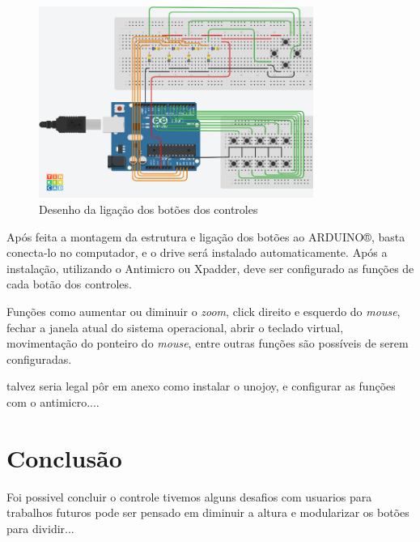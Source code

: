 \documentclass[
	12pt,			%
	openright,		%
	oneside,			%
	a4paper,			%
	chapter=TITLE,		%
	english,			%
	brazil,			%
	]{abntex2}
\begin{document}
\begin{figure}[H]
	\centering
		\includegraphics[width=0.8\textwidth]{./img/img-19.png}
		\caption{Desenho da ligação dos botões dos controles}
		\label{img:img-19}
\end{figure}

Após feita a montagem da estrutura e ligação dos botões ao ARDUINO®, basta conecta-lo no computador, e o drive será instalado automaticamente. Após a instalação, utilizando o Antimicro ou Xpadder, deve ser configurado as funções de cada botão dos controles.

Funções como aumentar ou diminuir o \emph{zoom}, click direito e esquerdo do \emph{mouse}, fechar a janela atual do sistema operacional, abrir o teclado virtual, movimentação do ponteiro do \emph{mouse}, entre outras funções são possíveis de serem configuradas.

talvez seria legal pôr em anexo como instalar o unojoy, e configurar as funções com o antimicro....


\chapter{Conclusão}

Foi possivel concluir o controle 
tivemos alguns desafios com usuarios 
para trabalhos futuros pode ser pensado em diminuir a altura e modularizar os botões para dividir...


%






\postextual
\end{document}
